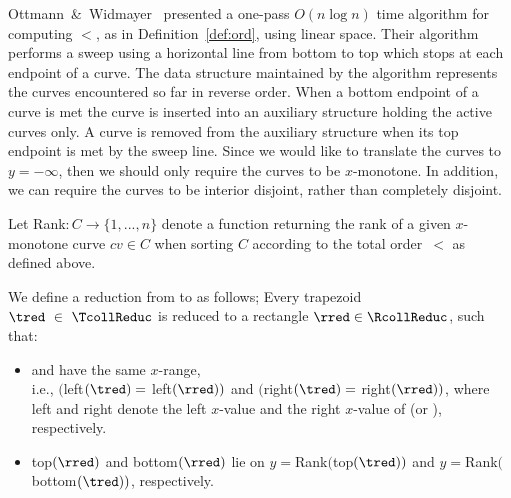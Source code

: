 Ottmann~\&~Widmayer~\cite{OW-TSLS-83} presented a one-pass
$O(n\log n)$ time algorithm for computing
$<$, as in Definition~\ref{def:ord}, using linear space.
Their algorithm performs a sweep using a horizontal line
from bottom to top which stops at each endpoint of a curve.
The data structure maintained by the algorithm represents
the curves encountered so far in reverse order.
When a bottom endpoint of a curve is met the curve is inserted into an auxiliary structure
holding the active curves only. A curve is removed from the auxiliary structure when its
top endpoint is met by the sweep line.
Since we would like to translate the curves to $y=-\infty$,
then we should only require the curves to be $x$-monotone.
In addition, we can require the curves to be interior disjoint,
rather than completely disjoint.



\begin{definition}
Let Rank$: C\rightarrow\{1,...,n\}$ denote a function
returning the rank of a given $x$-monotone curve $cv \in C$
when sorting $C$ according to the total order~$<$ as defined above. \end{definition}

\begin{definition}
\label{def:reduction}
We define a reduction from \TcollReduc to
\RcollReduc as follows;
Every trapezoid~$\tred~\in~\TcollReduc$ is
reduced to a rectangle $\rred \in \RcollReduc$,
such that:
\begin{itemize}
  \item \tred and \rred have the same $x$-range,\\
  i.e., $($left$(\tred) =$ left$(\rred))$ and
  $($right$(\tred) =$ right$(\rred))$,
  where left and right denote the left $x$-value
  and the right $x$-value of \tred (or \rred), respectively.
  \item top$(\rred)$ and bottom$(\rred)$ lie on $y=$Rank$($top$(\tred))$ and
  $y=$Rank$($bottom$(\tred))$, respectively.
\end{itemize}
\end{definition}


